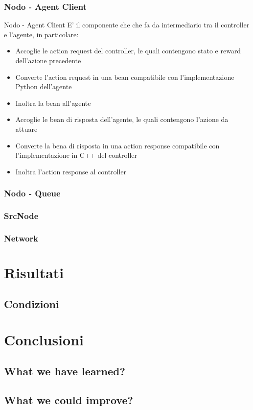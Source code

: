 \documentclass[compress]{beamer}
\begin{document}
\subsubsection*{Nodo - Agent Client}
\begin{frame}{Nodo - Agent Client}
    E' il componente che che fa da intermediario tra il controller e l'agente, in particolare:
    \begin{itemize}
        \item Accoglie le action request del controller, le quali contengono stato e reward dell'azione precedente 
        \item Converte l'action request in una bean compatibile con l'implementazione Python dell'agente
        \item Inoltra la bean all'agente
        \item Accoglie le bean di risposta dell'agente, le quali contengono l'azione da attuare
        \item Converte la bena di risposta in una action response compatibile con l'implementazione in C++ del controller
        \item Inoltra l'action response al controller
    \end{itemize}
\end{frame}

\subsubsection*{Nodo - Queue}

\subsubsection*{SrcNode}

\subsubsection*{Network}


\section*{Risultati}

\subsection*{Condizioni}


\section*{Conclusioni}

\subsection*{What we have learned?}

\subsection*{What we could improve?}
\end{document}
